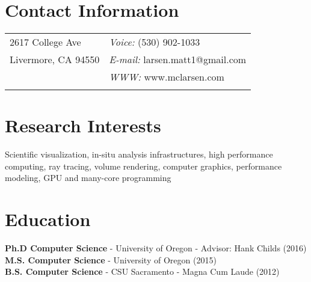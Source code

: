 \documentclass[margin,line]{res}
\begin{document}



\begin{resume}
\section{\sc Contact Information}
\vspace{.05in}

\begin{tabular}{@{}p{2in}p{4in}}
2617 College Ave     & {\it Voice:}  (530) 902-1033 \\
Livermore, CA 94550   &  {\it E-mail:}  larsen.matt1@gmail.com\\
                      &  {\it WWW:} www.mclarsen.com\\
                                 &  \\
\end{tabular}

\section{\sc Research Interests}
Scientific visualization, in-situ analysis infrastructures, high performance computing, ray tracing, volume rendering, computer graphics, performance modeling, GPU and many-core programming

\section{\sc Education}
\textbf{Ph.D Computer Science} - University of Oregon - Advisor: Hank Childs (2016)
\\
\textbf{M.S. Computer Science} - University of Oregon (2015)
\\
\textbf{B.S. Computer Science} - CSU Sacramento - Magna Cum Laude (2012)%


\end{resume}
\end{document}

